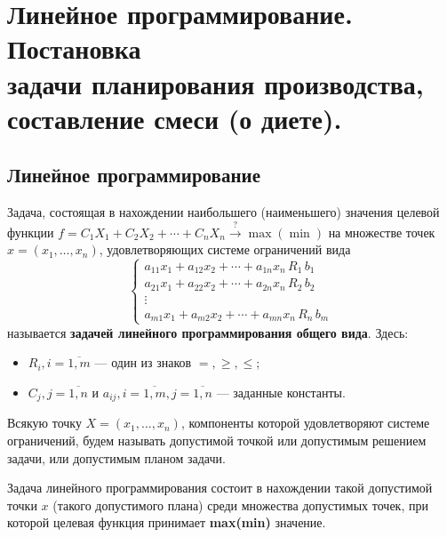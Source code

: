 \documentclass[17pt]{extarticle}
\begin{document}
\section{Линейное программирование. Постановка \\ задачи планирования производства, составление смеси (о диете).}
\subsection{Линейное программирование}

\begin{definition}
    Задача, состоящая в нахождении наибольшего (наименьшего) значения целевой функции
    \(
    f = C_1 X_1 + C_2 X_2 + \cdots + C_n X_n \xrightarrow{?} \max(\min)
    \)
    на множестве точек \( x = (x_1, \ldots, x_n) \), удовлетворяющих системе ограничений вида
    \[
        \begin{cases}
            a_{11}x_1 + a_{12}x_2 + \cdots + a_{1n}x_n \, R_1 \, b_1 \\
            a_{21}x_1 + a_{22}x_2 + \cdots + a_{2n}x_n \, R_2 \, b_2 \\
            \vdots                                                   \\
            a_{m1}x_1 + a_{m2}x_2 + \cdots + a_{mn}x_n \, R_n \, b_m
        \end{cases}
    \]
    называется \textbf{задачей линейного программирования общего вида}.
    Здесь:
    \begin{itemize}
        \item \( R_i, i = \overline{1, m} \) — один из знаков \( =, \geq, \leq \);
        \item \( C_j, j = \overline{1, n} \) и \( a_{ij}, i = \overline{1, m}, j = \overline{1, n} \) — заданные константы.
    \end{itemize}
\end{definition}

\begin{definition}
    Всякую точку \( X = (x_1, \ldots, x_n) \), компоненты которой удовлетворяют системе ограничений,
    будем называть допустимой точкой или допустимым решением задачи, или допустимым планом задачи.
\end{definition}

Задача линейного программирования состоит в нахождении такой допустимой точки \( x \) (такого допустимого плана)
среди множества допустимых точек,
при которой целевая функция принимает \textbf{max(min)} значение.
\end{document}
